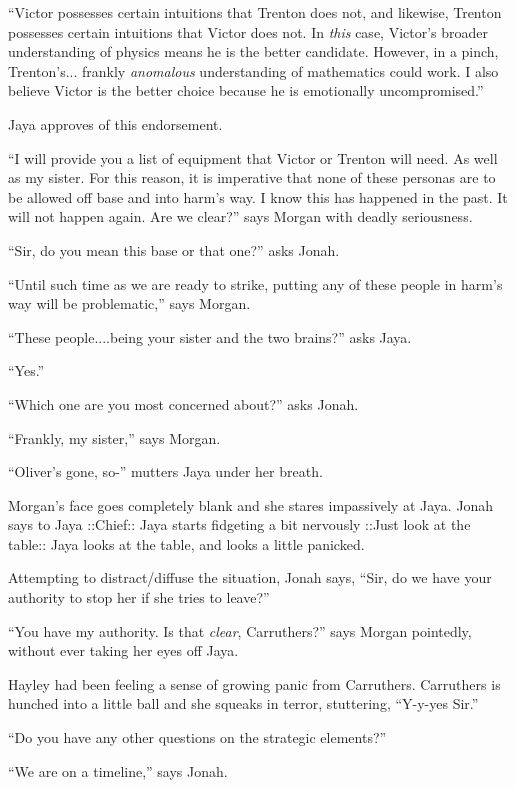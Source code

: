 ``Victor possesses certain intuitions that Trenton does not, and likewise, Trenton possesses certain intuitions that Victor does not.  In \textit{this} case, Victor's broader understanding of physics means he is the better candidate.  However, in a pinch, Trenton's... frankly \textit{anomalous }understanding of mathematics could work.  I also believe Victor is the better choice because he is emotionally uncompromised.''

Jaya approves of this endorsement.

``I will provide you a list of equipment that Victor or Trenton will need.  As well as my sister.  For this reason, it is imperative that none of these personas are to be allowed off base and into harm's way.  I know this has happened in the past. It will not happen again. Are we clear?'' says Morgan with deadly seriousness.

``Sir, do you mean this base or that one?'' asks Jonah.

``Until such time as we are ready to strike, putting any of these people in harm's way will be problematic,'' says Morgan.

``These people....being your sister and the two brains?'' asks Jaya.

``Yes.''

``Which one are you most concerned about?'' asks Jonah.

``Frankly, my sister,'' says Morgan.

``Oliver's gone, so-'' mutters Jaya under her breath.

Morgan's face goes completely blank and she stares impassively at Jaya.  Jonah says to Jaya  {\color[RGB]{74,134,232}::Chief::}  Jaya starts fidgeting a bit nervously   {\color[RGB]{74,134,232}::Just look at the table::}  Jaya looks at the table, and looks a little panicked.

Attempting to distract/diffuse the situation, Jonah says, ``Sir, do we have your authority to stop her if she tries to leave?''

``You have my authority.  Is that \textit{clear}, Carruthers?'' says Morgan pointedly, without ever taking her eyes off Jaya.

Hayley had been feeling a sense of growing panic from Carruthers.  Carruthers is hunched into a little ball and she squeaks in terror, stuttering, ``Y-y-yes Sir.''

``Do you have any other questions on the strategic elements?''

``We are on a timeline,'' says Jonah.

